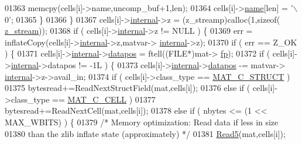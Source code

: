 \begin{DoxyCode}
{{{{{{{{01363                         memcpy(cells[i]->name,uncomp\_buf+1,len);
01364                         cells[i]->\hyperlink{group___m_a_t_a5d4b55b041e3b4fb50c04337f05ad909}{name}[len] = \textcolor{charliteral}{'\(\backslash\)0'};
01365                     \}
01366                 \}
01367                 cells[i]->\hyperlink{group___m_a_t_a6e97e3ed9f40c49322c18561c2a94e92}{internal}->z = (z\_streamp)calloc(1,\textcolor{keyword}{sizeof}(
      \hyperlink{structz__stream__s}{z\_stream}));
01368                 \textcolor{keywordflow}{if} ( cells[i]->\hyperlink{namespaceinternal}{internal}->z != NULL ) \{
01369                     err = inflateCopy(cells[i]->\hyperlink{namespaceinternal}{internal}->z,matvar->
      \hyperlink{group___m_a_t_a6e97e3ed9f40c49322c18561c2a94e92}{internal}->z);
01370                     \textcolor{keywordflow}{if} ( err == Z\_OK ) \{
01371                         cells[i]->\hyperlink{group___m_a_t_a6e97e3ed9f40c49322c18561c2a94e92}{internal}->\hyperlink{structmatvar__internal_afd3bfaab126a160bd6855563e1ea0a7e}{datapos} = ftell((FILE*)mat->
      \hyperlink{struct__mat__t_a85f562e407ca9ad4d2a6e14f839432b7}{fp});
01372                         \textcolor{keywordflow}{if} ( cells[i]->\hyperlink{namespaceinternal}{internal}->datapos != -1L ) \{
01373                             cells[i]->\hyperlink{group___m_a_t_a6e97e3ed9f40c49322c18561c2a94e92}{internal}->\hyperlink{structmatvar__internal_afd3bfaab126a160bd6855563e1ea0a7e}{datapos} -= matvar->
      \hyperlink{group___m_a_t_a6e97e3ed9f40c49322c18561c2a94e92}{internal}->z->avail\_in;
01374                             \textcolor{keywordflow}{if} ( cells[i]->class\_type == \hyperlink{group___m_a_t_ggad4d60ae7b709fc81bfd744fb4c857c40acb467c7749c80902b798134c729bb521}{MAT\_C\_STRUCT} )
01375                                 bytesread+=ReadNextStructField(mat,cells[i]);
01376                             \textcolor{keywordflow}{else} \textcolor{keywordflow}{if} ( cells[i]->class\_type == \hyperlink{group___m_a_t_ggad4d60ae7b709fc81bfd744fb4c857c40a2f7abb47a1c51e248bd4e5e03cc81b08}{MAT\_C\_CELL} )
01377                                 bytesread+=ReadNextCell(mat,cells[i]);
01378                             \textcolor{keywordflow}{else} \textcolor{keywordflow}{if} ( nbytes <= (1 << MAX\_WBITS) ) \{
01379                                 \textcolor{comment}{/* Memory optimization: Read data if less in size}
01380 \textcolor{comment}{                                   than the zlib inflate state (approximately) */}
01381                                 \hyperlink{mat5_8c_abd8669832a02e759fe190bf2724f60ae}{Read5}(mat,cells[i]);
}}}}}}}}
\end{DoxyCode}
